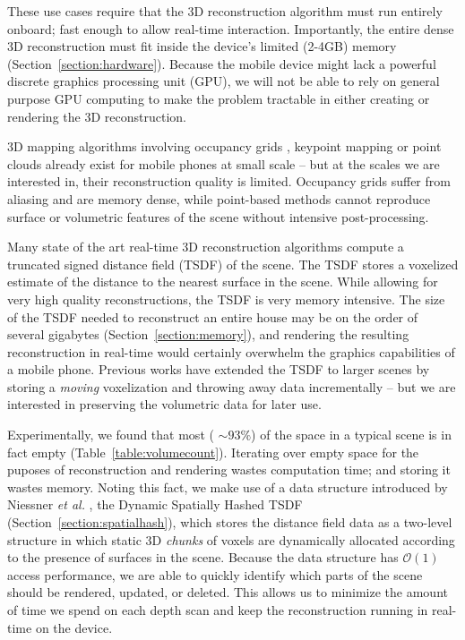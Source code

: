 \documentclass[conference]{IEEEtran}
\newcommand{\sref}[1]{Section~\ref{#1}}
\newcommand{\tabref}[1]{Table~\ref{#1}}
\newcommand{\etal}{\textit{et al. }}
\begin{document}
These use cases require that the 3D reconstruction algorithm must run entirely
onboard; fast enough to allow real-time interaction. Importantly, the entire
dense 3D reconstruction must fit inside the device's limited (2-4GB) memory
(\sref{section:hardware}). Because the mobile device might lack a powerful
discrete graphics processing unit (GPU), we will not be able to rely on general
purpose GPU computing to make the problem tractable in either creating or
rendering the 3D reconstruction.

3D mapping algorithms involving occupancy grids \cite{Elfes1989}, keypoint
mapping \cite{KleinSparse} or point clouds \cite{RusinkiewiczPoints,
TanskanenMetric, WeiseScanning} already exist for mobile phones at small scale
-- but at the scales we are interested in, their reconstruction quality is
limited. Occupancy grids suffer from aliasing and are memory dense, while
point-based methods cannot reproduce surface or volumetric features of the scene
without intensive post-processing.

Many state of the art real-time 3D reconstruction algorithms \cite{Newcombe,
Whelan2013,WhelanLoopClose,Bylow2013,NiessnerHashing} compute a truncated
signed distance field (TSDF) \cite{Curless1996} of the scene. The TSDF stores a
voxelized estimate of the distance to the nearest surface in the scene. While
allowing for very high quality reconstructions, the TSDF is very memory
intensive. The size of the TSDF needed to reconstruct an entire house may be on
the order of several gigabytes  (\sref{section:memory}), and rendering the
resulting reconstruction in real-time would certainly overwhelm the graphics
capabilities of a mobile phone. Previous works \cite{Whelan2013,
WhelanLoopClose} have extended the TSDF to larger scenes by storing a \textit{moving} voxelization
and throwing away data incrementally -- but we are interested in preserving the
volumetric data for later use.

Experimentally, we found that most ( $\sim 93\%$) of the space in a typical
scene is in fact empty (\tabref{table:volumecount}). Iterating over empty space
for the puposes of reconstruction and rendering wastes computation time; and storing it
wastes memory. Noting this fact, we make use of a data structure introduced by
Niessner \etal \cite{NiessnerHashing}, the Dynamic Spatially Hashed
\cite{SpatialHashing} TSDF (\sref{section:spatialhash}), which stores the
distance field data as a two-level structure in which static 3D \textit{chunks}
of voxels are dynamically allocated according to the presence of surfaces in the
scene. Because the data structure has $\mathcal{O}(1)$ access performance, we
are able to quickly identify which parts of the scene should be rendered,
updated, or deleted. This allows us to minimize the amount of time we spend on
each depth scan and keep the reconstruction running in real-time on the device. 
\end{document}
